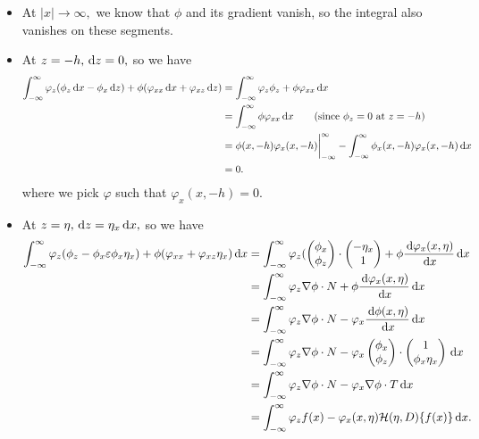\documentclass[10pt,reqno,oneside,a4paper]{article}
\begin{document}
\begin{itemize}
\item At $|x|\to \infty,$ we know that $\phi$ and its gradient vanish, so the integral also vanishes on these segments.
\item At $z = -h, \,\mathrm{d} z = 0,$ so we have 
\begin{align*}
\int^{\infty}_{-\infty}\varphi_z (\phi_z \,\mathrm{d} x - \phi_x \,\mathrm{d} z) + \phi(\varphi_{xx} \,\mathrm{d} x + \varphi_{xz} \,\mathrm{d} z) &= \int^{\infty}_{-\infty}\varphi_z \phi_z + \phi \varphi_{xx} \,\mathrm{d} x \\
&= \int^{\infty}_{-\infty} \phi \varphi_{xx} \,\mathrm{d} x \qquad \text{(since $\phi_z=0$ at $z =-h$)} \\
&= \phi(x,-h) \varphi_x(x, -h) \bigg|^{\infty}_{-\infty} - \int^{\infty}_{-\infty} \phi_x(x,-h)\varphi_x(x,-h) \,\mathrm{d} x \\
&= 0.
\end{align*}
where we pick $\varphi$ such that $\varphi_x(x, -h) = 0.$
\item At $z = \eta, \,\mathrm{d} z = \eta_x \,\mathrm{d} x,$ so we have 
\begin{align*}
\int_{-\infty}^{\infty} \varphi_z(\phi_z - \phi_x \varepsilon \phi_x \eta_x ) + \phi(\varphi_{xx}  +  \varphi_{xz} \eta_x) \,\mathrm{d} x &= \int_{-\infty}^{\infty} \varphi_z(\begin{pmatrix} \phi_x  \\ \phi_z \end{pmatrix}\cdot \begin{pmatrix} - \eta_x \\ 1 \end{pmatrix} + \phi \frac{\,\mathrm{d} \varphi_x(x, \eta)}{\,\mathrm{d} x} \,\mathrm{d} x \\
&= \int_{-\infty}^{\infty} \varphi_z \nabla \phi \cdot N+ \phi \dfrac{\,\mathrm{d} \varphi_x(x, \eta)}{\,\mathrm{d} x} \,\mathrm{d} x \\
&= \int_{-\infty}^{\infty} \varphi_z \nabla \phi \cdot N -\varphi_x \dfrac{\,\mathrm{d} \phi(x, \eta)}{\,\mathrm{d} x} \,\mathrm{d} x \\
&= \int_{-\infty}^{\infty} \varphi_z \nabla \phi \cdot N -\varphi_x \begin{pmatrix} \phi_x  \\ \phi_z \end{pmatrix} \cdot \begin{pmatrix} 1 \\ \phi_x \eta_x \end{pmatrix} \,\mathrm{d} x \\
&= \int_{-\infty}^{\infty} \varphi_z \nabla \phi \cdot N -\varphi_x \nabla \phi \cdot T \,\mathrm{d} x \\
&= \int_{-\infty}^{\infty} \varphi_z f(x) -\varphi_x(x, \eta) \mathcal{H}( \eta, D)\{ f(x) \} \,\mathrm{d} x. 
\end{align*}
\end{itemize}
\end{document}
